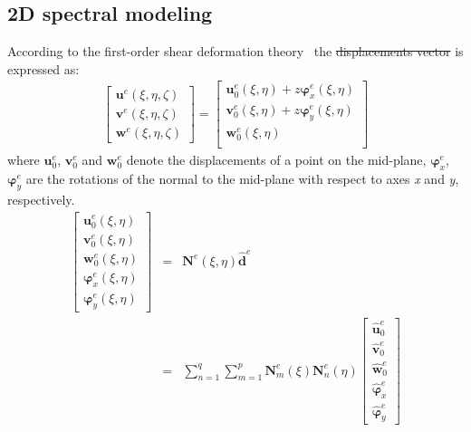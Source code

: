 \documentclass[materials,article,submit,moreauthors,pdftex]{Definitions/mdpi}
\providecommand{\DIFadd}[1]{{\protect\color{blue}{#1}}} %
\providecommand{\DIFdel}[1]{{\protect\color{red}\sout{#1}}}                      %
\providecommand{\DIFaddbegin}{} %
\providecommand{\DIFaddend}{} %
\providecommand{\DIFdelbegin}{} %
\providecommand{\DIFdelend}{} %
\begin{document}
\subsection{2D spectral modeling}
\label{sec:2D_SEM}

According to the first-order shear deformation theory~\cite{reissner1945effect, mindlin1951influence} the \DIFdelbegin \DIFdel{displacements vector }\DIFdelend \DIFaddbegin \DIFadd{vector of displacements }\DIFaddend is expressed as:
\begin{eqnarray}
\left [ \begin{array}{c}
\textbf{u}^e(\xi,\eta,\zeta) \\
\textbf{v}^e(\xi,\eta,\zeta) \\
\textbf{w}^e(\xi,\eta,\zeta)
\end{array} \right] = 
\left [ \begin{array}{c}
\textbf{u}_0^e(\xi,\eta) + z\boldsymbol{\varphi}_x^e(\xi,\eta)\\
\textbf{v}_0^e(\xi,\eta) + z\boldsymbol{\varphi}_y^e(\xi,\eta)\\
\textbf{w}_0^e(\xi,\eta) \\
\end{array} \right]
\end{eqnarray}
where \(\textbf{u}_0^e\), \(\textbf{v}_0^e\) and \(\textbf{w}_0^e\) denote the displacements of a point on the mid-plane, \(\boldsymbol{\varphi}_x^e\), \(\boldsymbol{\varphi}_y^e\) are the rotations of the normal to the mid-plane with respect to axes \textit{x} and \textit{y}, respectively.
\begin{eqnarray}
\left [ \begin{array}{c}
\textbf{u}_0^e(\xi,\eta) \\
\textbf{v}_0^e(\xi,\eta) \\
\textbf{w}_0^e(\xi,\eta) \\
\boldsymbol{\varphi}_x^e(\xi,\eta) \\
\boldsymbol{\varphi}_y^e(\xi,\eta)
\end{array} \right]
& = & \textbf{N}^e(\xi,\eta)\widehat{\textbf{d}}^e\nonumber\\
& = & \sum_{n=1}^q\sum_{m=1}^p\textbf{N}_m^e(\xi)\textbf{N}_n^e(\eta)
\left [ \begin{array}{c}
\widehat{\textbf{u}}_0^e \\
\widehat{\textbf{v}}_0^e \\
\widehat{\textbf{w}}_0^e \\
\widehat{\boldsymbol{\varphi}}_x^e \\
\widehat{\boldsymbol{\varphi}}_y^e
\end{array} \right]
\end{eqnarray}
\end{document}
